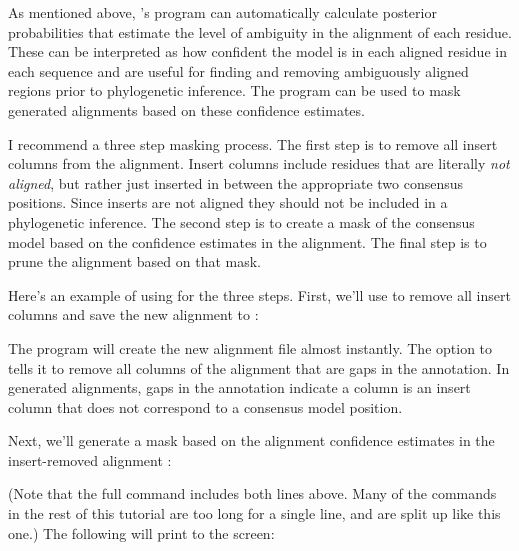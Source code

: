As mentioned above, 's  program
can automatically calculate posterior probabilities that estimate the
level of ambiguity in the alignment of each residue. These can be
interpreted as how confident the model is in each aligned residue in
each sequence and are useful for finding and
removing ambiguously aligned regions prior to phylogenetic inference.
The  program can be used to mask
 generated alignments based on these confidence estimates.

I recommend a three step masking process. The first step is to remove
all insert columns from the alignment. Insert columns include residues
that are literally \emph{not aligned}, but rather just inserted in
between the appropriate two consensus positions. 
Since inserts are
not aligned they should not be included in a phylogenetic inference.
The second step is to create a mask of the consensus model based on
the confidence estimates in the alignment. The final step is to prune
the alignment based on that mask.

Here's an example of using  for the three steps. 
First, we'll use  to remove all insert columns and
save the new alignment to :



The program will create the new alignment file
 almost instantly. 
The  option to  tells it to remove all
columns of the alignment that are gaps in the 
annotation. In  generated alignments, gaps in the
 annotation indicate a column is an insert column that
does not correspond to a consensus model position.

Next, we'll generate a mask based on the alignment confidence estimates
in the insert-removed alignment :


(Note that the full command includes both lines above. Many of the
commands in the rest of this tutorial are too long for a single line,
and are split up like this one.)
The following will print to the screen:

